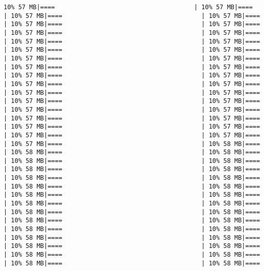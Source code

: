 \documentclass[
]{article}
\begin{document}
\begin{verbatim}
10% 57 MB|====                                      | 10% 57 MB|====                                      | 10% 57 MB|====                                      | 10% 57 MB|====                                      | 10% 57 MB|====                                      | 10% 57 MB|====                                      | 10% 57 MB|====                                      | 10% 57 MB|====                                      | 10% 57 MB|====                                      | 10% 57 MB|====                                      | 10% 57 MB|====                                      | 10% 57 MB|====                                      | 10% 57 MB|====                                      | 10% 57 MB|====                                      | 10% 57 MB|====                                      | 10% 57 MB|====                                      | 10% 57 MB|====                                      | 10% 57 MB|====                                      | 10% 57 MB|====                                      | 10% 57 MB|====                                      | 10% 57 MB|====                                      | 10% 57 MB|====                                      | 10% 57 MB|====                                      | 10% 57 MB|====                                      | 10% 57 MB|====                                      | 10% 57 MB|====                                      | 10% 57 MB|====                                      | 10% 57 MB|====                                      | 10% 57 MB|====                                      | 10% 57 MB|====                                      | 10% 57 MB|====                                      | 10% 57 MB|====                                      | 10% 57 MB|====                                      | 10% 58 MB|====                                      | 10% 58 MB|====                                      | 10% 58 MB|====                                      | 10% 58 MB|====                                      | 10% 58 MB|====                                      | 10% 58 MB|====                                      | 10% 58 MB|====                                      | 10% 58 MB|====                                      | 10% 58 MB|====                                      | 10% 58 MB|====                                      | 10% 58 MB|====                                      | 10% 58 MB|====                                      | 10% 58 MB|====                                      | 10% 58 MB|====                                      | 10% 58 MB|====                                      | 10% 58 MB|====                                      | 10% 58 MB|====                                      | 10% 58 MB|====                                      | 10% 58 MB|====                                      | 10% 58 MB|====                                      | 10% 58 MB|====                                      | 10% 58 MB|====                                      | 10% 58 MB|====                                      | 10% 58 MB|====                                      | 10% 58 MB|====                                      | 10% 58 MB|====                                      | 10% 58 MB|====                                      | 10% 58 MB|====                                      | 10% 58 MB|====           
\end{verbatim}
\end{document}
